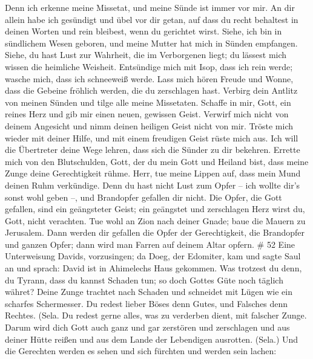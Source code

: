  Denn ich erkenne meine Missetat, und meine Sünde ist immer
vor mir.  An dir allein habe ich gesündigt und übel vor dir
getan, auf dass du recht behaltest in deinen Worten und rein bleibest,
wenn du gerichtet wirst.  Siehe, ich bin in sündlichem Wesen
geboren, und meine Mutter hat mich in Sünden empfangen. 
Siehe, du hast Lust zur Wahrheit, die im Verborgenen liegt; du lässest
mich wissen die heimliche Weisheit.  Entsündige mich mit
Isop, dass ich rein werde; wasche mich, dass ich schneeweiß werde.
 Lass mich hören Freude und Wonne, dass die Gebeine
fröhlich werden, die du zerschlagen hast.  Verbirg dein
Antlitz von meinen Sünden und tilge alle meine Missetaten. 
Schaffe in mir, Gott, ein reines Herz und gib mir einen neuen, gewissen
Geist.  Verwirf mich nicht von deinem Angesicht und nimm
deinen heiligen Geist nicht von mir.  Tröste mich wieder
mit deiner Hilfe, und mit einem freudigen Geist rüste mich aus.
 Ich will die Übertreter deine Wege lehren, dass sich die
Sünder zu dir bekehren.  Errette mich von den Blutschulden,
Gott, der du mein Gott und Heiland bist, dass meine Zunge deine
Gerechtigkeit rühme.  Herr, tue meine Lippen auf, dass mein
Mund deinen Ruhm verkündige.  Denn du hast nicht Lust zum
Opfer -- ich wollte dir's sonst wohl geben --, und Brandopfer gefallen
dir nicht.  Die Opfer, die Gott gefallen, sind ein
geängsteter Geist; ein geängstet und zerschlagen Herz wirst du, Gott,
nicht verachten.  Tue wohl an Zion nach deiner Gnade; baue
die Mauern zu Jerusalem.  Dann werden dir gefallen die
Opfer der Gerechtigkeit, die Brandopfer und ganzen Opfer; dann wird man
Farren auf deinem Altar opfern. \# 52  Eine Unterweisung
Davids, vorzusingen;  da Doeg, der Edomiter, kam und sagte
Saul an und sprach: David ist in Ahimelechs Haus gekommen. 
Was trotzest du denn, du Tyrann, dass du kannst Schaden tun; so doch
Gottes Güte noch täglich währet?  Deine Zunge trachtet nach
Schaden und schneidet mit Lügen wie ein scharfes Schermesser.
 Du redest lieber Böses denn Gutes, und Falsches denn
Rechtes. (Sela.  Du redest gerne alles, was zu verderben
dient, mit falscher Zunge.  Darum wird dich Gott auch ganz
und gar zerstören und zerschlagen und aus deiner Hütte reißen und aus
dem Lande der Lebendigen ausrotten. (Sela.)  Und die
Gerechten werden es sehen und sich fürchten und werden sein lachen:
